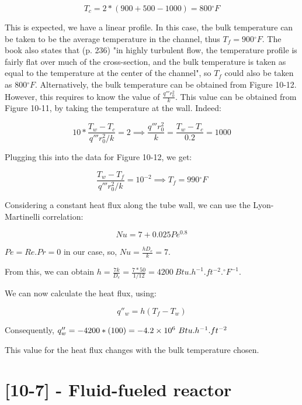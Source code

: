 \begin{equation}
T_c = 2*(900+500-1000) = 800{}^\circ F
\end{equation}

This is expected, we have a linear profile. In this case, the bulk temperature can be taken to be the average temperature in the channel, thus $T_f = 900{}^\circ F$. The book also states that (p. 236) "in highly turbulent flow, the temperature profile is fairly flat  over much of the cross-section, and the bulk temperature is taken as equal to the temperature at the center of the channel", so $T_f$ could also be taken as $800{}^\circ F$. Alternatively, the bulk temperature can be obtained from Figure 10-12. However, this requires to know the value of $\frac{q'''r_0^2}{k}$. This value can be obtained from Figure 10-11, by taking the temperature at the wall. Indeed:

\begin{equation}
10*\frac{T_w - T_c}{q'''r_0^2/k} = 2 \implies \frac{q'''r_0^2}{k} = \frac{T_w - T_c}{0.2} = 1000
\end{equation}

Plugging this into the data for Figure 10-12, we get:

\begin{equation}
\frac{T_w - T_f}{q'''r_0^2/k} = 10^{-2} \implies T_f = 990{}^\circ F
\end{equation}

Considering a constant heat flux along the tube wall, we can use the Lyon-Martinelli correlation:

\begin{equation}
Nu = 7 + 0.025Pe^{0.8}
\end{equation}

$Pe = Re.Pr = 0$ in our case, so, $Nu = \frac{hD_e}{k} = 7$.

From this, we can obtain $h = \frac{7k}{D_e} = \frac{7 * 50}{1/12} = 4200\ Btu.h^{-1}.ft^{-2}.{}^\circ F^{-1}$.

We can now calculate the heat flux, using:

\begin{equation}
q''_w = h(T_f - T_w)
\end{equation}

Consequently, $q''_w = - 4200 * (100) = -\text{\num{4.2e6}}\ Btu.h^{-1}.ft^{-2}$

This value for the heat flux changes with the bulk temperature chosen.

\section{[10-7] - Fluid-fueled reactor}
\label{prob102}


